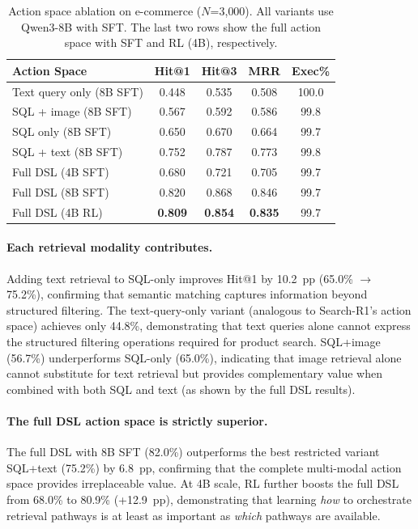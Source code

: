 \documentclass[11pt]{article}
\begin{document}
\begin{table}[t]
\centering
\small
\caption{Action space ablation on e-commerce ($N$=3{,}000). All variants use Qwen3-8B with SFT. The last two rows show the full action space with SFT and RL (4B), respectively.}
\label{tab:action_space}
\begin{tabular}{lcccc}
\toprule
\textbf{Action Space} & \textbf{Hit@1} & \textbf{Hit@3} & \textbf{MRR} & \textbf{Exec\%} \\
\midrule
Text query only (8B SFT) & 0.448 & 0.535 & 0.508 & 100.0 \\
SQL + image (8B SFT) & 0.567 & 0.592 & 0.586 & 99.8 \\
SQL only (8B SFT) & 0.650 & 0.670 & 0.664 & 99.7 \\
SQL + text (8B SFT) & 0.752 & 0.787 & 0.773 & 99.8 \\
\midrule
Full DSL (4B SFT) & 0.680 & 0.721 & 0.705 & 99.7 \\
Full DSL (8B SFT) & 0.820 & 0.868 & 0.846 & 99.7 \\
Full DSL (4B RL) & \textbf{0.809} & \textbf{0.854} & \textbf{0.835} & 99.7 \\
\bottomrule
\end{tabular}
\end{table}

\paragraph{Each retrieval modality contributes.}
Adding text retrieval to SQL-only improves Hit@1 by 10.2~pp (65.0\% $\to$ 75.2\%), confirming that semantic matching captures information beyond structured filtering.
The text-query-only variant (analogous to Search-R1's action space) achieves only 44.8\%, demonstrating that text queries alone cannot express the structured filtering operations required for product search.
SQL+image (56.7\%) underperforms SQL-only (65.0\%), indicating that image retrieval alone cannot substitute for text retrieval but provides complementary value when combined with both SQL and text (as shown by the full DSL results).

\paragraph{The full DSL action space is strictly superior.}
The full DSL with 8B SFT (82.0\%) outperforms the best restricted variant SQL+text (75.2\%) by 6.8~pp, confirming that the complete multi-modal action space provides irreplaceable value. At 4B scale, RL further boosts the full DSL from 68.0\% to 80.9\% (+12.9~pp), demonstrating that learning \emph{how} to orchestrate retrieval pathways is at least as important as \emph{which} pathways are available.
\end{document}
